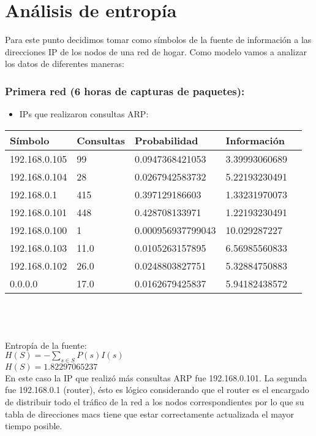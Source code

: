 \section{An\'alisis de entrop\'ia}


\indent Para este punto decidimos tomar como s\'imbolos de la fuente de informaci\'on a las direcciones IP de los nodos de una red de hogar.
Como modelo vamos a analizar los datos de diferentes maneras:

\subsubsection{Primera red (6 horas de capturas de paquetes):}

\begin{itemize}
 \item  IPs que realizaron consultas ARP:
\end{itemize}

\begin{tabular}{|l|l|l|l|l|}
  \hline
  S\'imbolo & Consultas & Probabilidad & Informaci\'on \\
  \hline
  192.168.0.105 & 99 & 0.0947368421053 & 3.39993060689 \\
  \hline
  192.168.0.104 & 28 & 0.0267942583732 & 5.22193230491 \\
  \hline
  192.168.0.1 & 415 & 0.397129186603  & 1.33231970073 \\
  \hline
  192.168.0.101 & 448 & 0.428708133971 & 1.22193230491 \\
  \hline
  192.168.0.100 & 1 & 0.000956937799043 & 10.029287227 \\
  \hline
  192.168.0.103 & 11.0 & 0.0105263157895 & 6.56985560833 \\
  \hline
  192.168.0.102 & 26.0 & 0.0248803827751 & 5.32884750883 \\
  \hline
  0.0.0.0 & 17.0 & 0.0162679425837 & 5.94182438572 \\
  \hline
\end{tabular}

\\ \ \\ \ \\ 
Entrop\'ia de la fuente:\\
$H(S) = -\sum_{s \in S} P(s) I(s)$\\
$H(S) = 1.82297065237$\\

En este caso la IP que realiz\'o m\'as consultas ARP fue 192.168.0.101. 
La segunda fue 192.168.0.1 (router), \'esto es l\'ogico considerando que el router es el encargado de distribuir todo el tr\'afico de la red a los nodos correspondientes por lo que su tabla
de direcciones macs tiene que estar correctamente actualizada el mayor tiempo posible.

